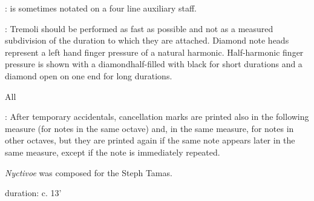 \documentclass[11pt]{article}
\newcommand*\circled[1]{\tikz[baseline=(char.base)]{
            \node[shape=circle,draw,inner sep=1pt] (char) {#1};}}
\begin{document}
\begin{center}
 : is sometimes notated on a four line auxiliary staff.
\rightskip\leftskip
\phantom{text} \hfill \phantom{()}

 : \circled{1} Tremoli should be performed as fast as possible and not as a measured subdivision of the duration to which they are attached. \circled{2} Diamond note heads represent a left hand finger pressure of a natural harmonic. \circled{3} Half-harmonic finger pressure is shown with a diamondhalf-filled with black for short durations and a diamond open on one end for long durations.
\rightskip\leftskip
\phantom{text} \hfill \phantom{()}

\end{center}
\endgroup

\begin{center}
\huge All
\end{center}
\begingroup
\begin{center}

 : After temporary accidentals, cancellation marks are printed also in the following measure (for notes in the same octave) and, in the same measure, for notes in other octaves, but they are printed again if the same note appears later in the same measure, except if the note is immediately repeated.
\rightskip\leftskip
\phantom{text} \hfill \phantom{()}

\end{center}
\endgroup

\vspace*{9\baselineskip}

\begin{center}
\textit{Nyctivoe} was composed for the Steph Tamas.
\end{center}

\vspace*{23\baselineskip}

\begin{center}
duration: c. 13'
\end{center}
\end{document}
